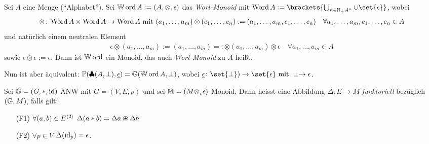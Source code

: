 \begin{example}
    Sei $A$ eine Menge (``Alphabet''). Sei $\operatorname{\mathbb W\operatorname{ord}} A := (A, \otimes, \epsilon)$ das \emph{Wort-Monoid} mit $\Word A := \brackets{\bigcup_{n \in \N_+ A^n}\cup \set{\epsilon}}$, wobei \begin{align*}
        \otimes\colon \operatorname{Word} A \times \operatorname{Word} A \to \operatorname{Word} A \text{ mit } (a_1, \dots, a_m)\otimes (c_1, \dots, c_n) := (a_1, \dots, a_m, c_1, \dots, c_n) \quad \forall a_1, \dots,a_m; c_1, \dots, c_n \in A 
    \end{align*}
und natürlich einem neutralen Element
    \begin{align*}
        \epsilon \otimes (a_1, \dots, a_m) := (a_1, \dots, a_m) =: \otimes (a_1, \dots, a_m) \otimes \epsilon \quad \forall a_1, \dots, a_m \in A
    \end{align*}
sowie $\epsilon \otimes \epsilon := \epsilon$. Dann ist $\operatorname{\mathbb W\operatorname{ord}}$ ein Monoid, das auch \emph{Wort-Monoid} zu $A$ heißt.
\end{example}
\begin{remark}
    Nun ist aber äquivalent: $\mathbb{P}(\clubsuit(A,\perp), \underline{\epsilon}) = \mathbb{G}(\operatorname{\mathbb W\operatorname{ord}} A,\perp)$, wobei $\underline{\epsilon} \colon \set{\perp}) \to \set{\epsilon} \mit \perp \to \epsilon$.
\end{remark}
\begin{definition}
    Sei $\mathbb{G} = (G, \ast, \operatorname{id})$ ANW mit $G = (V,E,\rho)$ und sei $\mathbb{M} = (M \otimes, \epsilon)$ Monoid. Dann heisst eine Abbildung $\Delta\colon E \to M$ \emph{funktoriell} bezüglich $(\mathbb{G}, M)$, falls gilt:
    \begin{enumerate}
        \item[(F1)] $\forall (a,b) \in E^{\langle 2\rangle}$ $\Delta(a \ast b) = \Delta a \ostar \Delta b$
        \item[(F2)] $\forall p \in V$ $\Delta(\operatorname{id}_p) = \epsilon$.
    \end{enumerate}
\end{definition}

